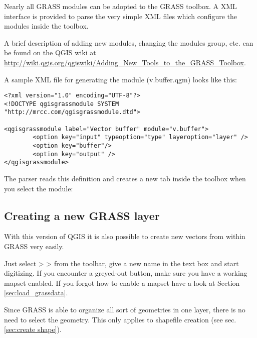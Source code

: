 Nearly all GRASS modules can be adopted to the GRASS toolbox. A XML interface is provided to parse
the very simple XML files which configure the modules inside the toolbox.

A brief description of adding new modules, changing the modules group, etc. can be found on the QGIS wiki
at \url{http://wiki.qgis.org/qgiswiki/Adding\_New\_Tools\_to\_the\_GRASS\_Toolbox}.

A sample XML file for generating the module  (v.buffer.qgm) looks like this:
\begin{verbatim}
<?xml version="1.0" encoding="UTF-8"?>
<!DOCTYPE qgisgrassmodule SYSTEM "http://mrcc.com/qgisgrassmodule.dtd">

<qgisgrassmodule label="Vector buffer" module="v.buffer">
        <option key="input" typeoption="type" layeroption="layer" />
        <option key="buffer"/>
        <option key="output" />
</qgisgrassmodule>
\end{verbatim}


The parser reads this definition and creates a new tab inside the toolbox when you select 
the module:


\subsection{Creating a new GRASS layer}\label{sec:creating_new_grass_vectors}

With this version of QGIS it is also possible to create new vectors from within GRASS very
easily.

Just select  >  > 
 from the toolbar, give a new name in the text box and start digitizing.
If you encounter a greyed-out button, make sure you have a working mapset enabled. If you forgot
how to enable a mapset have a look at Section \ref{sec:load_grassdata}.

Since GRASS is able to organize all sort of geometries in one layer, there is no need to select
the geometry. This only applies to shapefile creation (see sec. \ref{sec:create shape}).

